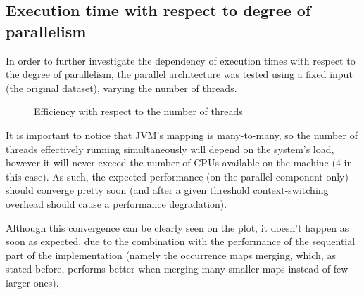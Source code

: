 \subsection{Execution time with respect to degree of parallelism}
In order to further investigate the dependency of execution times with respect to the degree of parallelism, the parallel architecture was tested using a fixed input (the original dataset), varying the number of threads.

\begin{figure}[H]
	\center
	\caption{Efficiency with respect to the number of threads}
	\label{fig:threads}
\end{figure}

It is important to notice that JVM's mapping is many-to-many, so the number of threads effectively running simultaneously will depend on the system's load, however it will never exceed the number of CPUs available on the machine (4 in this case).
As such, the expected performance (on the parallel component only) should converge pretty soon (and after a given threshold context-switching overhead should cause a performance degradation).

Although this convergence can be clearly seen on the plot, it doesn't happen as soon as expected, due to the combination with the performance of the sequential part of the implementation (namely the occurrence maps merging, which, as stated before, performs better when merging many smaller maps instead of few larger ones).

